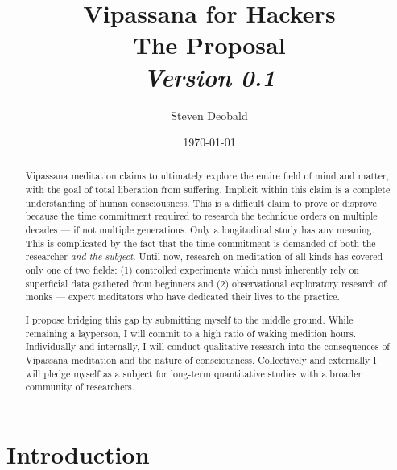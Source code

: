 \documentclass[a4paper, amsfonts, amssymb, amsmath, reprint, showkeys, nofootinbib, twoside]{revtex4-1}
\begin{document}
\title{%
  \large{Vipassana for Hackers} \\
  \Huge{The Proposal} \\
  \large\textit{Version 0.1}
}
\author{Steven Deobald}
\date{\today}

\begin{abstract}
Vipassana meditation claims to ultimately explore the entire field of
mind and matter, with the goal of total liberation from suffering. Implicit
within this claim is a complete understanding of human consciousness.
This is a difficult claim to prove or disprove because the time commitment
required to research the technique orders on multiple decades
--- if not multiple generations.
Only a longitudinal study has any meaning.
This is complicated by the fact that the time commitment is demanded of
both the researcher \textit{and the subject}.
Until now, research on meditation of all kinds has covered only one of two fields:
(1) controlled experiments which must inherently rely on superficial data
gathered from beginners \cite{https://doi.org/10.1002/jclp.20761,
  https://doi.org/10.1037/a0018441,
  https://doi.org/10.1093/scan/nss054,
  https://doi.org/10.31231/osf.io/hzv65}
and (2) observational exploratory research of monks --- expert
meditators who have dedicated their lives to the practice.
\cite{https://doi.org/10.1073/pnas.0407401101,
https://doi.org/10.1371/journal.pone.0073417}

I propose bridging this
gap by submitting myself to the middle ground. While remaining a layperson, I will
commit to a high ratio of waking medition hours.
Individually and internally, I will conduct qualitative research into the consequences of
Vipassana meditation and the nature of consciousness.
Collectively and externally I will pledge myself as a subject for long-term quantitative
studies with a broader community of researchers.

\end{abstract}


\maketitle

\listoftodos

\section{Introduction}
\end{document}
